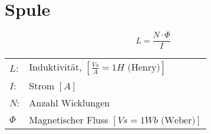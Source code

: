 



\newpage
\section{Spule}
\[ L = \frac{N \cdot \Phi}{I} \]
\begin{tabular}{@{}ll}
  $L$:      & Induktivität, $\left[\frac{Vs}{A} = 1H \text{ (Henry)}\right]$ \\
  $I$:      & Strom $[A]$ \\
  $N$:      & Anzahl Wicklungen \\
  $\Phi$    & Magnetischer Fluss $\left[ Vs = 1Wb \text{ (Weber)}\right]$
\end{tabular}